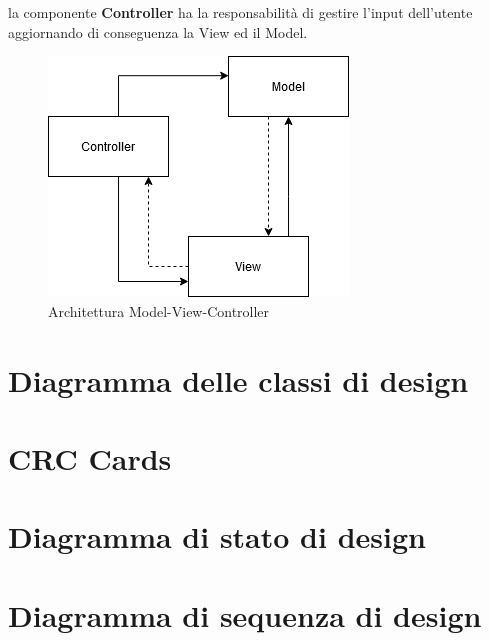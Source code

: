 la componente \textbf{Controller} ha la responsabilità di gestire l'input dell'utente aggiornando di conseguenza
la View ed il Model.
\begin{center}
    \begin{figure}[H]
        \includegraphics[width=\textwidth]{Figures/MVC client.png}
        \caption{Architettura Model-View-Controller}
    \end{figure}
\end{center}
\section{Diagramma delle classi di design}

\section{CRC  Cards}

\section{Diagramma di stato di design}

\section{Diagramma di sequenza di design}